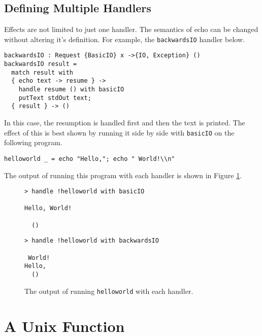 \documentclass[logo,bsc,singlespacing,parskip]{infthesis}
\begin{document}
\subsection{Defining Multiple Handlers}

Effects are not limited to just one handler. The semantics of echo can be
changed without altering it's definition. For example, the \texttt{backwardsIO}
handler below.

\begin{lstlisting}[language=unison]
backwardsIO : Request {BasicIO} x ->{IO, Exception} () 
backwardsIO result =
  match result with
  { echo text -> resume } -> 
    handle resume () with basicIO 
    putText stdOut text;
  { result } -> ()
\end{lstlisting}

In this case, the resumption is handled first and then the text is printed. The
effect of this is best shown by running it side by side with \texttt{basicIO}
on the following program.

\begin{lstlisting}[language=unison]
helloworld _ = echo "Hello,"; echo " World!\\n"
\end{lstlisting}

The output of running this program with each handler is shown in Figure \ref{fig:sidebyside}.

\begin{figure}[h]
  \label{fig:sidebyside}
\begin{minipage}{0.5\textwidth}

\begin{lstlisting}[style=terminal]
> handle !helloworld with basicIO

Hello, World!

  ()
\end{lstlisting}

\end{minipage}%
\begin{minipage}{0.5\textwidth}

\begin{lstlisting}[style=terminal]
 > handle !helloworld with backwardsIO

 World!
Hello,
  ()
\end{lstlisting}
\end{minipage}
\caption{The output of running \texttt{helloworld} with each handler.}
\end{figure}

\section{A Unix Function}
\end{document}
